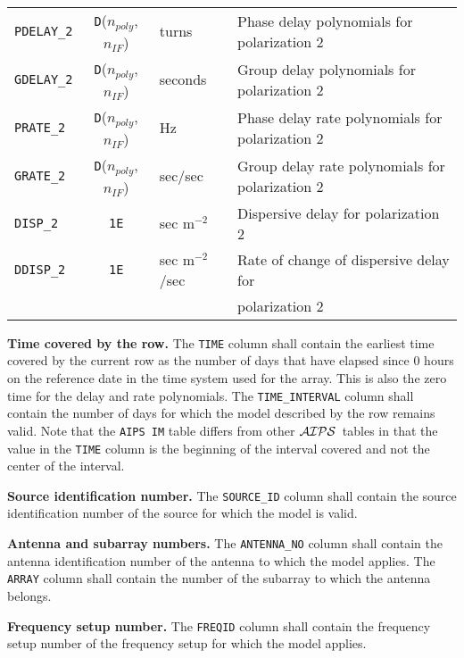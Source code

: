 \documentclass[twoside]{article}
\newcommand{\AIPS}{{$\cal AIPS\/$}}
\newcommand{\nif}{$n_{IF}$}
\newcommand{\npoly}{$n_{poly}$}
\begin{document}
\begin{center}
\begin{tabular}{lcll}
\hline
{\tt PDELAY\_2}   & {\tt D}(\npoly,\nif) & turns & Phase delay
                                       polynomials for polarization 2 \\
{\tt GDELAY\_2}   & {\tt D}(\npoly,\nif) & seconds & Group delay
                                       polynomials for polarization 2 \\
{\tt PRATE\_2}    & {\tt D}(\npoly,\nif) & Hz & Phase delay rate
                                       polynomials for polarization 2 \\
{\tt GRATE\_2}    & {\tt D}(\npoly,\nif) & sec/sec & Group delay rate
                                       polynomials for polarization 2 \\
{\tt DISP\_2}     & {\tt 1E} & sec m$^{-2}$ & Dispersive delay for
                                       polarization 2 \\
{\tt DDISP\_2}    & {\tt 1E} & sec m$^{-2}$/sec & Rate of change of dispersive
                                       delay for \\
                  &          &         & \hspace{1em} polarization 2
\end{tabular}
\end{center}

{\bf Time covered by the row.}  The {\tt TIME} column shall contain
the earliest time covered by the current row as the number of days
that have elapsed since 0 hours on the reference date in the time
system used for the array.  This is also the zero time for the delay
and rate polynomials.  The {\tt TIME\_INTERVAL} column shall contain
the number of days for which the model described by the row remains
valid.  Note that the {\tt AIPS IM} table differs from other \AIPS\
tables in that the value in the {\tt TIME} column is the beginning of
the interval covered and not the center of the interval.

{\bf Source identification number.}  The {\tt SOURCE\_ID} column shall
contain the source identification number of the source for which the
model is valid.

{\bf Antenna and subarray numbers.}  The {\tt ANTENNA\_NO} column
shall contain the antenna identification number of the antenna to
which the model applies.  The {\tt ARRAY} column shall contain the
number of the subarray to which the antenna belongs.

{\bf Frequency setup number.}  The {\tt FREQID} column shall contain
the frequency setup number of the frequency setup for which the model
applies.
\end{document}
